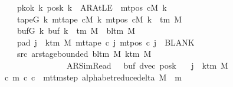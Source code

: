 \begin{isabellebody}
\ \ \ \ \ \ \ pkok{\isacharcolon}{\kern0pt}\ {\isachardoublequoteopen}{\isasymAnd}k{\isachardot}{\kern0pt}\ posk{}\ k\ {\isacharequal}{\kern0pt}\ AR{\isacharunderscore}{\kern0pt}AtLE\ {\isasymlongleftrightarrow}\ mt{\isacharunderscore}{\kern0pt}pos\ cM\ k\ {\isacharequal}{\kern0pt}\ {}{\isachardoublequoteclose}\isanewline
\ \ \ \ \ \ \ tapeG{\isacharcolon}{\kern0pt}\ {\isachardoublequoteopen}{\isasymAnd}k{\isachardot}{\kern0pt}\ mt{\isacharunderscore}{\kern0pt}tape\ cM\ k\ {\isacharparenleft}{\kern0pt}mt{\isacharunderscore}{\kern0pt}pos\ cM\ k{\isacharparenright}{\kern0pt}\ {\isasymin}\ {\isasymGamma}{\isacharunderscore}{\kern0pt}tm\ M{\isachardoublequoteclose}\isanewline
\ \ \ \ \ \ \ bufG{\isacharcolon}{\kern0pt}\ {\isachardoublequoteopen}{\isasymAnd}k{\isachardot}{\kern0pt}\ buf{}\ k\ {\isasymin}\ {\isasymGamma}{\isacharunderscore}{\kern0pt}tm\ M\ {\isasymunion}\ {\isacharbraceleft}{\kern0pt}bl{\isacharunderscore}{\kern0pt}tm\ M{\isacharbraceright}{\kern0pt}{\isachardoublequoteclose}\isanewline
\ \ \ \ \ \ \ pad{}{\isacharcolon}{\kern0pt}\ {\isachardoublequoteopen}{\isasymforall}j\ {\isasymge}\ k{\isacharunderscore}{\kern0pt}tm\ M{\isachardot}{\kern0pt}\ mt{\isacharunderscore}{\kern0pt}tape\ c{}\ j\ {\isacharparenleft}{\kern0pt}mt{\isacharunderscore}{\kern0pt}pos\ c{}\ j{\isacharparenright}{\kern0pt}\ {\isacharequal}{\kern0pt}\ BLANK{}{\isachardoublequoteclose}\isanewline
\ \ \ \ \ \ \ src{}{\isacharcolon}{\kern0pt}\ {\isachardoublequoteopen}ar{\isacharunderscore}{\kern0pt}stage{\isacharunderscore}{\kern0pt}bounded\ {\isacharparenleft}{\kern0pt}bl{\isacharunderscore}{\kern0pt}tm\ M{\isacharparenright}{\kern0pt}\ {\isacharparenleft}{\kern0pt}k{\isacharunderscore}{\kern0pt}tm\ M{\isacharparenright}{\kern0pt}\isanewline
\ \ \ \ \ \ \ \ \ \ \ \ \ \ \ \ \ \ \ {\isacharparenleft}{\kern0pt}AR{\isacharunderscore}{\kern0pt}SimRead{\isacharcomma}{\kern0pt}\ {}{\isacharcomma}{\kern0pt}\ {}{\isacharcomma}{\kern0pt}\ buf{}{\isacharcomma}{\kern0pt}\ dvec{\isacharcomma}{\kern0pt}\ posk{}{\isacharparenright}{\kern0pt}{\isachardoublequoteclose}\isanewline
\ \ \ {\isachardoublequoteopen}j\ {\isasymle}\ k{\isacharunderscore}{\kern0pt}tm\ M\ {\isacharminus}{\kern0pt}\ {}\ {\isasymLongrightarrow}\isanewline
\ \ \ \ {\isacharparenleft}{\kern0pt}{\isasymexists}c\ m{\isachardot}{\kern0pt}\ {\isacharparenleft}{\kern0pt}c{}{\isacharcomma}{\kern0pt}\ c{\isacharparenright}{\kern0pt}\ {\isasymin}\ {\isacharparenleft}{\kern0pt}mttm{\isacharunderscore}{\kern0pt}step\ {\isacharparenleft}{\kern0pt}alphabet{\isacharunderscore}{\kern0pt}reduce{\isacharunderscore}{\kern0pt}delta\ M{\isacharparenright}{\kern0pt}{\isacharparenright}{\kern0pt}\ {\isacharcircum}{\kern0pt}{\isacharcircum}{\kern0pt}\ m\isanewline

\end{isabellebody}
